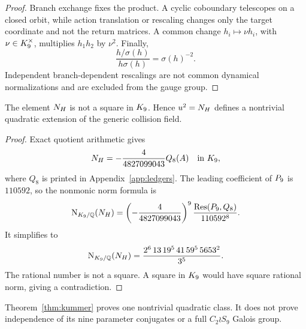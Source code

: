 \begin{proof}
Branch exchange fixes the product.  A cyclic coboundary telescopes on a
closed orbit, while action translation or rescaling changes only the target
coordinate and not the return matrices.  A common change
\(h_i\mapsto\nu h_i\), with \(\nu\in K_9^\times\), multiplies
\(h_1h_2\) by \(\nu^2\).  Finally,
\[
\frac{h/\sigma(h)}{h\sigma(h)}=\sigma(h)^{-2}.
\]
Independent branch-dependent rescalings are not common dynamical
normalizations and are excluded from the gauge group.
\end{proof}

\begin{theorem}\label{thm:kummer}
The element \(N_H\) is not a square in \(K_9\).  Hence \(u^2=N_H\) defines a
nontrivial quadratic extension of the generic collision field.
\end{theorem}

\begin{proof}
Exact quotient arithmetic gives
\[
N_H=-\frac4{4827099043}Q_8(A)
\quad\text{in }K_9,
\]
where \(Q_8\) is printed in Appendix~\ref{app:ledgers}.  The leading
coefficient of \(P_9\) is \(110592\), so the nonmonic norm formula is
\[
\operatorname{N}_{K_9/\mathbb{Q}}(N_H)=
\left(-\frac4{4827099043}\right)^9
\frac{\operatorname{Res}(P_9,Q_8)}{110592^8}.
\]
It simplifies to
\begin{equation}
\operatorname{N}_{K_9/\mathbb{Q}}(N_H)
=\frac{2^6\,13\,19^5\,41\,59^5\,5653^2}{3^5}.             \label{eq:norm}
\end{equation}
The rational number is not a square.  A square in \(K_9\) would have square
rational norm, giving a contradiction.
\end{proof}

Theorem~\ref{thm:kummer} proves one nontrivial quadratic class.  It does not
prove independence of its nine parameter conjugates or a full
\(C_2\wr S_9\) Galois group.
